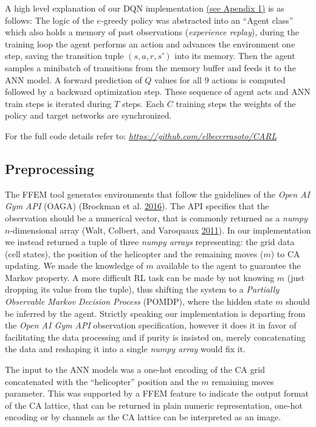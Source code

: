 \documentclass[
  12pt,
  openany]{book}
\begin{document}
A high level explanation of our DQN implementation \protect\hyperlink{deep-q-networks-dqn-using-open-ai-gym-api}{(see Apendix 1)} is as follows: The logic of the \(e\)-greedy policy was abstracted into an ``Agent class'' which also holds a memory of past observations (\emph{experience replay}), during the training loop the agent performs an action and advances the environment one step, saving the transition tuple \((s,a,r,s')\) into its memory. Then the agent samples a minibatch of transitions from the memory buffer and feeds it to the ANN model. A forward prediction of \(Q\) values for all \(9\) actions is computed followed by a backward optimization step. These sequence of agent acts and ANN train steps is iterated during \(T\) steps. Each \(C\) training steps the weights of the policy and target networks are synchronized.

For the full code details refer to: \emph{\url{https://github.com/elbecerrasoto/CARL}}

\hypertarget{preprocessing}{%
\subsection{Preprocessing}\label{preprocessing}}

The FFEM tool generates environments that follow the guidelines of the \emph{Open AI Gym API} (OAGA) (Brockman et al. \protect\hyperlink{ref-1606.01540}{2016}). The API specifies that the observation should be a numerical vector, that is commonly returned as a \emph{numpy} \(n\)-dimensional array (Walt, Colbert, and Varoquaux \protect\hyperlink{ref-walt2011numpy}{2011}). In our implementation we instead returned a tuple of three \emph{numpy arrays} representing: the grid data (cell states), the position of the helicopter and the remaining moves (\(m\)) to CA updating. We made the knowledge of \(m\) available to the agent to guarantee the Markov property. A more difficult RL task can be made by not knowing \(m\) (just dropping its value from the tuple), thus shifting the system to a \emph{Partially Observable Markov Decision Process} (POMDP), where the hidden state \(m\) should be inferred by the agent. Strictly speaking our implementation is departing from the \emph{Open AI Gym API} observation specification, however it does it in favor of facilitating the data processing and if purity is insisted on, merely concatenating the data and reshaping it into a single \emph{numpy array} would fix it.

The input to the ANN models was a one-hot encoding of the CA grid concatenated with the ``helicopter'' position and the \(m\) remaining moves parameter. This was supported by a FFEM feature to indicate the output format of the CA lattice, that can be returned in plain numeric representation, one-hot encoding or by channels as the CA lattice can be interpreted as an image.
\end{document}
